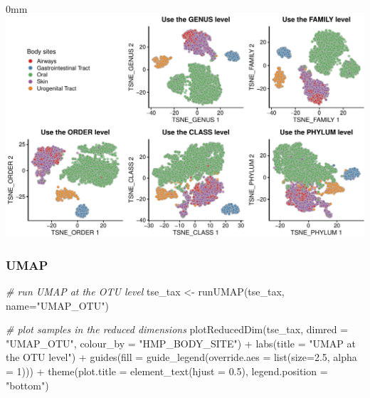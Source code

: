 \documentclass[]{article}
\newcommand{\hlnum}[1]{\textcolor[rgb]{0.816,0.125,0.439}{#1}}%
\newcommand{\hlstr}[1]{\textcolor[rgb]{0.251,0.627,0.251}{#1}}%
\newcommand{\hlcom}[1]{\textcolor[rgb]{0.502,0.502,0.502}{\textit{#1}}}%
\newcommand{\hlopt}[1]{\textcolor[rgb]{0,0,0}{#1}}%
\newcommand{\hlstd}[1]{\textcolor[rgb]{0.251,0.251,0.251}{#1}}%
\newcommand{\hlkwc}[1]{\textcolor[rgb]{0.251,0.251,0.251}{#1}}%
\newcommand{\hlkwd}[1]{\textcolor[rgb]{0.878,0.439,0.125}{#1}}%
\newenvironment{Shaded}{\begin{myshaded}}{\end{myshaded}}
\newcommand{\KeywordTok}[1]{\hlkwd{#1}}
\newcommand{\DataTypeTok}[1]{\hlkwc{#1}}
\newcommand{\DecValTok}[1]{\hlnum{#1}}
\newcommand{\FloatTok}[1]{\hlnum{#1}}
\newcommand{\StringTok}[1]{\hlstr{#1}}
\newcommand{\CommentTok}[1]{\hlcom{#1}}
\newcommand{\OperatorTok}[1]{\hlopt{#1}}
\newcommand{\NormalTok}[1]{\hlstd{#1}}
\begin{document}
\begin{adjustwidth}{\fltoffset}{0mm}
\includegraphics[width=1\linewidth,]{figure/unnamed-chunk-61-1} \end{adjustwidth}

\hypertarget{umap}{%
\subsubsection{UMAP}\label{umap}}

\begin{Shaded}
\begin{Highlighting}[]
\CommentTok{# run UMAP at the OTU level}
\NormalTok{tse_tax <-}\StringTok{ }\KeywordTok{runUMAP}\NormalTok{(tse_tax, }\DataTypeTok{name=}\StringTok{"UMAP_OTU"}\NormalTok{)}

\CommentTok{# plot samples in the reduced dimensions}
\KeywordTok{plotReducedDim}\NormalTok{(tse_tax, }\DataTypeTok{dimred =} \StringTok{"UMAP_OTU"}\NormalTok{, }
               \DataTypeTok{colour_by =} \StringTok{"HMP_BODY_SITE"}\NormalTok{) }\OperatorTok{+}
\StringTok{  }\KeywordTok{labs}\NormalTok{(}\DataTypeTok{title =} \StringTok{"UMAP at the OTU level"}\NormalTok{) }\OperatorTok{+}
\StringTok{  }\KeywordTok{guides}\NormalTok{(}\DataTypeTok{fill =} \KeywordTok{guide_legend}\NormalTok{(}\DataTypeTok{override.aes =} \KeywordTok{list}\NormalTok{(}\DataTypeTok{size=}\FloatTok{2.5}\NormalTok{, }\DataTypeTok{alpha =} \DecValTok{1}\NormalTok{))) }\OperatorTok{+}
\StringTok{  }\KeywordTok{theme}\NormalTok{(}\DataTypeTok{plot.title =} \KeywordTok{element_text}\NormalTok{(}\DataTypeTok{hjust =} \FloatTok{0.5}\NormalTok{),}
        \DataTypeTok{legend.position =} \StringTok{"bottom"}\NormalTok{)}
\end{Highlighting}
\end{Shaded}
\end{document}

